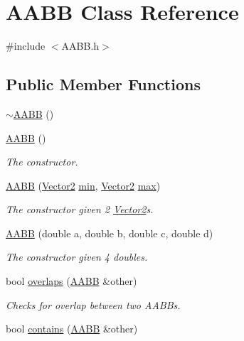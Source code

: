\hypertarget{class_a_a_b_b}{}\section{A\+A\+BB Class Reference}
\label{class_a_a_b_b}


{\ttfamily \#include $<$A\+A\+B\+B.\+h$>$}

\subsection*{Public Member Functions}
\begin{DoxyCompactItemize}
\item 
\mbox{\hyperlink{class_a_a_b_b_afd5f4956a2043597167ff66821f7b223}{$\sim$\+A\+A\+BB}} ()
\item 
\mbox{\hyperlink{class_a_a_b_b_a5f5baf6c533905aa1456b3a3eb57bab2}{A\+A\+BB}} ()
\begin{DoxyCompactList}\small\item\em The constructor. \end{DoxyCompactList}\item 
\mbox{\hyperlink{class_a_a_b_b_adf4f9cc4708df46e3c791ecb66ab2850}{A\+A\+BB}} (\mbox{\hyperlink{struct_vector2}{Vector2}} \mbox{\hyperlink{class_a_a_b_b_a6e0ad742511375d51f29f84c599b411d}{min}}, \mbox{\hyperlink{struct_vector2}{Vector2}} \mbox{\hyperlink{class_a_a_b_b_ad14f0a02aba39bcba965b15524921401}{max}})
\begin{DoxyCompactList}\small\item\em The constructor given 2 \mbox{\hyperlink{struct_vector2}{Vector2}}\textquotesingle{}s. \end{DoxyCompactList}\item 
\mbox{\hyperlink{class_a_a_b_b_ac5d91f2d365a1a54f20106dec77f0cc9}{A\+A\+BB}} (double a, double b, double c, double d)
\begin{DoxyCompactList}\small\item\em The constructor given 4 doubles. \end{DoxyCompactList}\item 
bool \mbox{\hyperlink{class_a_a_b_b_a28f0730e24e311de17180e3e42bc8d3d}{overlaps}} (\mbox{\hyperlink{class_a_a_b_b}{A\+A\+BB}} \&other)
\begin{DoxyCompactList}\small\item\em Checks for overlap between two A\+A\+B\+Bs. \end{DoxyCompactList}\item 
bool \mbox{\hyperlink{class_a_a_b_b_af78525aaf74115bd847a2f3a53d2b29a}{contains}} (\mbox{\hyperlink{class_a_a_b_b}{A\+A\+BB}} \&other)

\end{DoxyCompactItemize}
